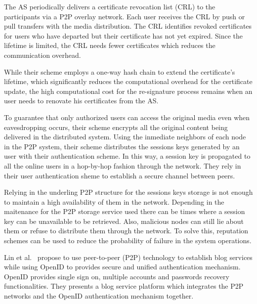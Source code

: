 The AS periodically delivers a certificate revocation list (CRL) to the
participants via a P2P overlay network. Each user receives the CRL by push or
pull transfers with the media distribution. The CRL identifies revoked
certificates for users who have departed but their certificate
 has not yet expired. Since the lifetime is limited, the
CRL needs fewer certificates which reduces the
communication overhead.

While their scheme employs a one-way hash chain to extend the
certificate’s lifetime, which significantly reduces
the computational overhead for the certificate update, the high computational cost
for the re-signature process remains when
an user needs to renovate his certificates from the AS. 

To guarantee that only authorized users can access the
original media even when eavesdropping occurs, their scheme encrypts all the 
original content being delivered in the distributed system.
Using the inmediate neighbors of each node in the P2P system,
their scheme distributes the sessions keys generated by an user with their
authentication scheme.
In this way, a session key is propagated to
all the online users in a hop-by-hop fashion through the network. They rely in their user authentication sheme to establish a secure channel
between peers. 

Relying in the underling P2P structure for the sessions keys storage is
not enough to maintain a high availability of them in the network. Depending in
the maitenance for the P2P storage service used there can be times where a
session key can be unavailable to be retrieved. Also, malicious
nodes can still lie about them or refuse to distribute them through the
network. To solve this, reputation schemes can be used to reduce the
probability of failure in the system operations.


Lin et al.~\cite{lin2008p2p} propose to use peer-to-peer (P2P) technology to
establish blog services while using OpenID to provides secure and unified
authentication mechanism. OpenID provides single sign on, multiple accounts and
passwords recovery functionalities. They presents a blog service platform which integrates the P2P networks and the
OpenID authentication mechanism together.





